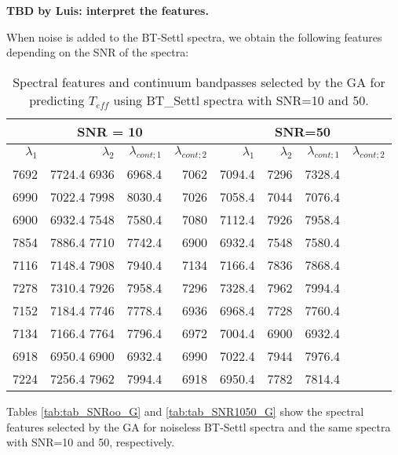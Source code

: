 {\bf TBD by Luis: interpret the features.}

When noise is added to the BT-Settl spectra, we obtain the following
features depending on the SNR of the spectra:

\begin{table*}
\begin{center}
\begin{tabular}{rrrr | rrrr}
  \hline
 \multicolumn{4}{c}{SNR = 10} &  \multicolumn{4}{c}{SNR=50} \\
  \hline
$\lambda_1$ & $\lambda_2$ & $\lambda_{cont;1}$ & $\lambda_{cont;2} $ & $\lambda_1$ & $\lambda_2$ & $\lambda_{cont;1}$ & $\lambda_{cont;2} $ \\ 
  \hline
7692 & 7724.4 	6936 & 6968.4  & 7062 & 7094.4 &  7296 & 7328.4 \\
6990 & 7022.4 	7998 & 8030.4  & 7026 & 7058.4 &  7044 & 7076.4 \\
6900 & 6932.4 	7548 & 7580.4  & 7080 & 7112.4 &  7926 & 7958.4 \\
7854 & 7886.4 	7710 & 7742.4  & 6900 & 6932.4 &  7548 & 7580.4 \\
7116 & 7148.4 	7908 & 7940.4  & 7134 & 7166.4 &  7836 & 7868.4 \\
7278 & 7310.4 	7926 & 7958.4  & 7296 & 7328.4 &  7962 & 7994.4 \\
7152 & 7184.4 	7746 & 7778.4  & 6936 & 6968.4 &  7728 & 7760.4 \\
7134 & 7166.4 	7764 & 7796.4  & 6972 & 7004.4 &  6900 & 6932.4 \\
6918 & 6950.4 	6900 & 6932.4  & 6990 & 7022.4 &  7944 & 7976.4 \\
7224 & 7256.4 	7962 & 7994.4  & 6918 & 6950.4 &  7782 & 7814.4 \\

\hline
\end{tabular}
\caption {Spectral features and continuum bandpasses selected by the GA for predicting $ T_{eff}$ 
using BT\_Settl spectra with SNR=10 and 50.} \label{tab:tab_SNR1050_T}
\end{center}
\end{table*}

Tables \ref{tab:tab_SNRoo_G} and \ref{tab:tab_SNR1050_G} show the
spectral features selected by the GA for noiseless BT-Settl spectra
and the same spectra with SNR=10 and 50, respectively.

